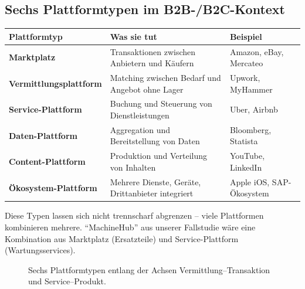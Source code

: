 \documentclass[11pt,a4paper,oneside]{article}
\begin{document}
\subsection{Sechs Plattformtypen im B2B-/B2C-Kontext}

\begin{tabularx}{\linewidth}{@{}>{\bfseries}lXl@{}}
\toprule
Plattformtyp & Was sie tut & Beispiel \\
\midrule
Marktplatz             & Transaktionen zwischen Anbietern und Käufern    & Amazon, eBay, Mercateo \\
Vermittlungsplattform  & Matching zwischen Bedarf und Angebot ohne Lager  & Upwork, MyHammer \\
Service-Plattform      & Buchung und Steuerung von Dienstleistungen       & Uber, Airbnb \\
Daten-Plattform        & Aggregation und Bereitstellung von Daten         & Bloomberg, Statista \\
Content-Plattform      & Produktion und Verteilung von Inhalten           & YouTube, LinkedIn \\
Ökosystem-Plattform    & Mehrere Dienste, Geräte, Drittanbieter integriert & Apple iOS, SAP-Ökosystem \\
\bottomrule
\end{tabularx}

\medskip

\noindent Diese Typen lassen sich nicht trennscharf abgrenzen -- viele Plattformen kombinieren mehrere. ``MachineHub'' aus unserer Fallstudie wäre eine Kombination aus Marktplatz (Ersatzteile) und Service-Plattform (Wartungsservices).

\begin{figure}[h]
\centering
{}
\caption{\sffamily Sechs Plattformtypen entlang der Achsen Vermittlung--Transaktion und Service--Produkt.}
\label{fig:plattformtypen-22t03}
\end{figure}
\end{document}
